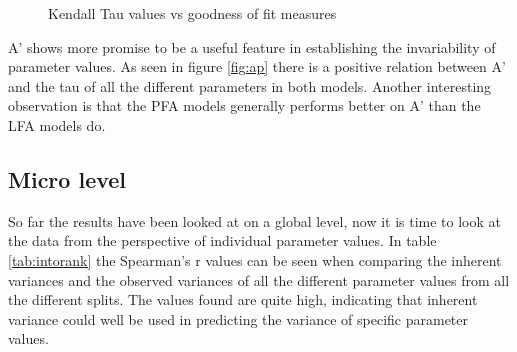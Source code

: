 \documentclass{scrartcl}
\begin{document}
\begin{figure}[!htbp]
\centering
{}
\caption{Kendall Tau values vs goodness of fit measures}
\end{figure}

A' shows more promise to be a useful feature in establishing the invariability of parameter values. As seen in figure \ref{fig:ap} there is a positive relation between A' and the tau of all the different parameters in both models. Another interesting observation is that the PFA models generally performs better on A' than the LFA models do.

\subsection{Micro level}
So far the results have been looked at on a global level, now it is time to look at the data from the perspective of individual parameter values. In table \ref{tab:intorank} the Spearman's r values can be seen when comparing the inherent variances and the observed variances of all the different parameter values from all the different splits. The values found are quite high, indicating that inherent variance could well be used in predicting the variance of specific parameter values. 
\end{document}
